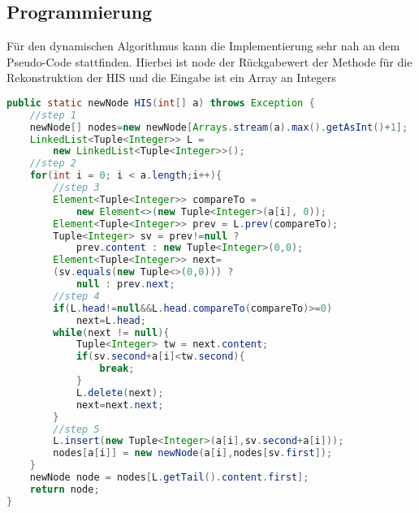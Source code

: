 \subsection{Programmierung}
Für den dynamischen Algorithmus  kann die Implementierung sehr nah an dem Pseudo-Code stattfinden. Hierbei ist node der Rückgabewert der Methode für die Rekonstruktion der HIS und die Eingabe ist ein Array an Integers
\begin{lstlisting}[mathescape,language=Java]
public static newNode HIS(int[] a) throws Exception {
    //step 1
    newNode[] nodes=new newNode[Arrays.stream(a).max().getAsInt()+1];
    LinkedList<Tuple<Integer>> L =
        new LinkedList<Tuple<Integer>>();
    //step 2
    for(int i = 0; i < a.length;i++){
        //step 3
        Element<Tuple<Integer>> compareTo = 
            new Element<>(new Tuple<Integer>(a[i], 0));
        Element<Tuple<Integer>> prev = L.prev(compareTo);
        Tuple<Integer> sv = prev!=null ? 
            prev.content : new Tuple<Integer>(0,0);
        Element<Tuple<Integer>> next= 
        (sv.equals(new Tuple<>(0,0))) ?
            null : prev.next;
        //step 4
        if(L.head!=null&&L.head.compareTo(compareTo)>=0)
            next=L.head;
        while(next != null){
            Tuple<Integer> tw = next.content;
            if(sv.second+a[i]<tw.second){
                break;
            }
            L.delete(next);
            next=next.next;
        }
        //step 5
        L.insert(new Tuple<Integer>(a[i],sv.second+a[i]));
        nodes[a[i]] = new newNode(a[i],nodes[sv.first]);
    }
    newNode node = nodes[L.getTail().content.first];
    return node;
}
\end{lstlisting}

